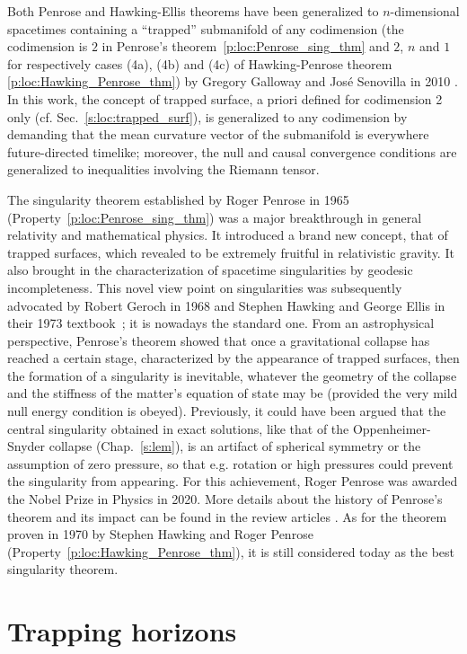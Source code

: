 \begin{remark}
Both Penrose and Hawking-Ellis theorems have been generalized to $n$-dimensional spacetimes containing a ``trapped'' submanifold
of any codimension (the codimension is $2$ in Penrose's theorem~\ref{p:loc:Penrose_sing_thm}
and $2$, $n$ and $1$ for respectively cases (4a), (4b) and (4c) of Hawking-Penrose theorem \ref{p:loc:Hawking_Penrose_thm}) by Gregory Galloway and
José Senovilla in 2010 \cite{GalloS10}.
In this work,
the concept of trapped surface, a priori defined for
codimension 2 only (cf. Sec.~\ref{s:loc:trapped_surf}), is generalized to any codimension
by demanding that the mean curvature vector of the submanifold is everywhere future-directed timelike; moreover, the null and causal convergence conditions
are generalized to inequalities involving the Riemann tensor.
\end{remark}

\begin{hist}
The singularity theorem established by Roger Penrose
in 1965 \cite{Penro65} (Property~\ref{p:loc:Penrose_sing_thm})
was a major breakthrough in general relativity and mathematical physics.
It introduced a brand new concept, that of trapped surfaces, which revealed to
be extremely fruitful in relativistic gravity. It also brought in the characterization of
spacetime singularities by geodesic incompleteness. This novel view point on
singularities was subsequently advocated by Robert Geroch
in 1968 \cite{Geroc68} and Stephen Hawking and George Ellis in their 1973 textbook~\cite{HawkiE73}; it is nowadays the standard one. From an astrophysical perspective, Penrose's theorem showed that
once a gravitational collapse has reached a certain stage, characterized by the appearance
of trapped surfaces, then the formation of a singularity is inevitable, whatever the
geometry of the collapse and the stiffness of the matter's equation of state may be (provided
the very mild null energy condition is obeyed). Previously, it could have been
argued that the central singularity obtained in exact solutions, like that
of the Oppenheimer-Snyder collapse (Chap.~\ref{s:lem}), is an artifact of spherical
symmetry or the assumption of zero pressure, so that e.g. rotation or high pressures could
prevent the singularity from appearing. For this achievement, Roger Penrose was awarded the Nobel Prize in Physics in 2020.
More details about the history of Penrose's theorem and its impact can be found
in the review articles \cite{Senov22a,Senov22b,SenovG15,Lands22}.
As for the theorem
proven in 1970 by Stephen Hawking  and
Roger Penrose \cite{HawkiP70} (Property~\ref{p:loc:Hawking_Penrose_thm}),
it is still considered today as the best singularity theorem.
\end{hist}



\section{Trapping horizons}


